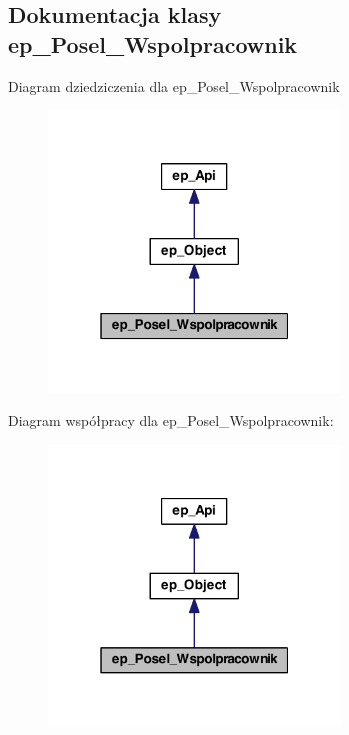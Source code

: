 \hypertarget{classep___posel___wspolpracownik}{\subsection{Dokumentacja klasy ep\-\_\-\-Posel\-\_\-\-Wspolpracownik}
\label{classep___posel___wspolpracownik}
}


Diagram dziedziczenia dla ep\-\_\-\-Posel\-\_\-\-Wspolpracownik\nopagebreak
\begin{figure}[H]
\begin{center}
\leavevmode
\includegraphics[width=220pt]{classep___posel___wspolpracownik__inherit__graph}
\end{center}
\end{figure}


Diagram współpracy dla ep\-\_\-\-Posel\-\_\-\-Wspolpracownik\-:\nopagebreak
\begin{figure}[H]
\begin{center}
\leavevmode
\includegraphics[width=220pt]{classep___posel___wspolpracownik__coll__graph}
\end{center}
\end{figure}
